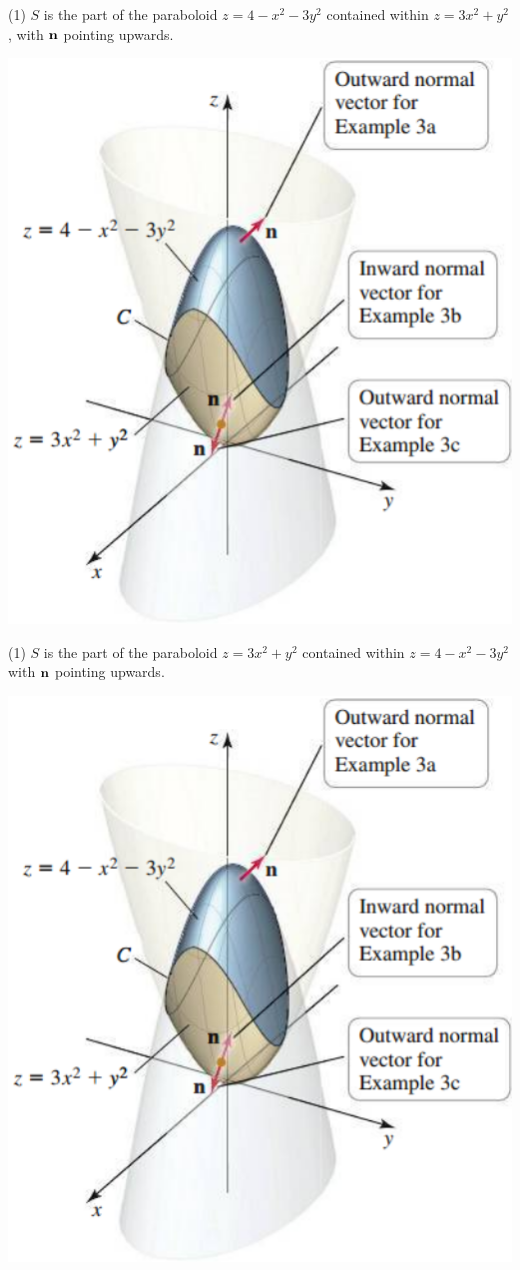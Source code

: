 \documentclass[mathNotesPreamble]{subfiles}
\begin{document}
  \noindent
  \begin{minipage}[t]{0.55\linewidth}
    \begin{tasks}[after-item-skip=\stretch{1}, label=\textbullet, item-indent=0pt](1)
      \task $S$ is the part of the paraboloid $z=4-x^2-3y^2$ contained within $z=3x^2+y^2$, with ${\mathbf{n}}$ pointing upwards.
    \end{tasks}
  \end{minipage}%
  \begin{minipage}[t]{0.45\linewidth}\mbox{}
    \vspace*{-1.5\baselineskip}
    \begin{flushright}
      \includegraphics[width=0.78\linewidth]{images/briggs_17_07/fig17_63}
    \end{flushright}
  \end{minipage}%
  \pagebreak
  \begin{tasks}[after-item-skip=\stretch{1}, label=\textbullet, item-indent=0pt, resume](1)
    \task $S$ is the part of the paraboloid $z=3x^2+y^2$ contained within $z=4-x^2-3y^2$ with ${\mathbf{n}}$ pointing upwards.
  \end{tasks}
  \begin{flushright}
    \includegraphics[width=0.35\linewidth]{images/briggs_17_07/fig17_63}
  \end{flushright}
\end{document}

